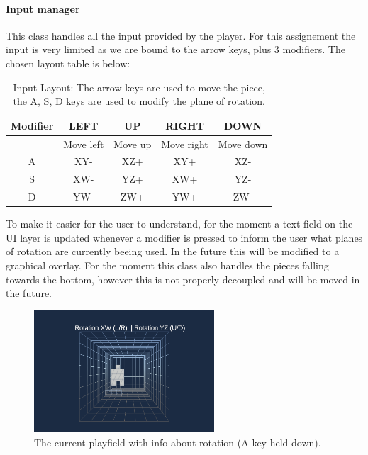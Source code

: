 \documentclass{article}
\begin{document}
\paragraph{Input manager}
This class handles all the input provided by the player. For this assignement the input is very limited as we are bound to the arrow keys, plus 3 modifiers. The chosen layout table is below:
\begin{table}[H]
    \centering
    \begin{tabular}{|c|c|c|c|c|}
    \hline
    Modifier & LEFT & UP & RIGHT& DOWN\\
    \hline
     & Move left & Move up & Move right & Move down\\
    A & XY- & XZ+ & XY+ & XZ-\\
    S & XW- & YZ+ & XW+ & YZ-\\
    D & YW- & ZW+ & YW+ & ZW-\\
    \hline
    \end{tabular}
    \caption{Input Layout: The arrow keys are used to move the piece, the A, S, D keys are used to modify the plane of rotation.}
    \label{tab:input}
\end{table}
To make it easier for the user to understand, for the moment a text field on the UI layer is updated whenever a modifier is pressed to inform the user what planes of rotation are currently beeing used. In the future this will be modified to a graphical overlay.
For the moment this class also handles the pieces falling towards the bottom, however this is not properly decoupled and will be moved in the future.
\begin{figure}
    \centering
    \includegraphics[width=0.6\textwidth]{./Dev/play_with_pointers.png}
    \caption{The current playfield with info about rotation (A key held down).}
    \label{fig:input}
\end{figure}
\end{document}
